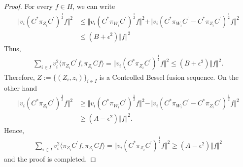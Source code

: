 \documentclass{mfatshort}
\begin{document}
\begin{proof}
For every  $f \in H$, we can write
\begin{align*}
\Vert v_{i}(C^{*}\pi_{Z_{i}} C^{\prime})^{\frac{1}{2}}f \Vert^{2}&\leq\Vert v_{i}(C^{*}\pi_{W_{i}} C^{\prime})^{\frac{1}{2}}f \Vert^{2}+\Vert v_{i}(C^{*}\pi_{W_{i}} C^{\prime}-C^{*}\pi_{Z_{i}} C^{\prime})^{\frac{1}{2}}f \Vert^{2}\\
&\leq(B+\epsilon^{2})\Vert f\Vert^{2}
\end{align*}
Thus,
\begin{align*}
\sum _{i\in I} v_{i}^{2} \langle \pi_{Z_{i}} C^{\prime}f,\pi_{Z_{i}} Cf \rangle =\Vert v_{i}(C^{*}\pi_{Z_{i}} C^{\prime})^{\frac{1}{2}}f \Vert^{2}\leq(B+\epsilon^{2})\Vert f\Vert^{2}.
\end{align*}
Therefore, $Z:=\lbrace(Z_{i},z_{i})\rbrace _{i \in I}$ is a Controlled Bessel fusion sequence. On the other hand
\begin{align*}
\Vert v_{i}(C^{*}\pi_{Z_{i}} C^{\prime})^{\frac{1}{2}}f \Vert^{2}&\geq\Vert v_{i}(C^{*}\pi_{W_{i}} C^{\prime})^{\frac{1}{2}}f \Vert^{2}-\Vert v_{i}(C^{*}\pi_{W_{i}} C^{\prime}-C^{*}\pi_{Z_{i}} C^{\prime})^{\frac{1}{2}}f \Vert^{2}\\
&\geq(A-\epsilon^{2})\Vert f\Vert^{2}.
\end{align*}
Hence,
\begin{align*}
\sum _{i\in I} v_{i}^{2} \langle \pi_{Z_{i}} C^{\prime}f,\pi_{Z_{i}} Cf \rangle =\Vert v_{i}(C^{*}\pi_{Z_{i}} C^{\prime})^{\frac{1}{2}}f \Vert^{2}\geq(A-\epsilon^{2})\Vert f\Vert^{2}
\end{align*}
and the proof is completed.
\end{proof}
\end{document}
